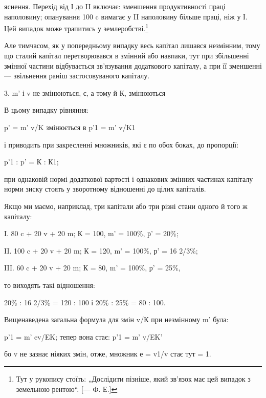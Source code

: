 яснення. Перехід від І до II включає: зменшення продуктивності
праці наполовину; опанування 100 c вимагає у II наполовину
більше праці, ніж у І. Цей випадок може трапитись у землеробстві.\footnote{
Тут у рукопису стоїть: „Дослідити пізніше, який зв’язок має цей випадок
з земельною рентою“. [— Ф. Е.]
}

Але тимчасом, як у попередньому випадку весь капітал
лишався незмінним, тому що сталий капітал перетворювався
в змінний або навпаки, тут при збільшенні змінної частини відбувається
зв’язування додаткового капіталу, а при її зменшенні —
звільнення раніш застосовуваного капіталу.

3. m' і v не змінюються, с, а тому й К, змінюються

В цьому випадку рівняння:

p' = m' v/K змінюється в p'1 = m' v/K1

і приводить при закресленні множників, які є по обох боках,
до пропорції:

p'1 : p' = К : К1;

при однаковій нормі додаткової вартості і однакових змінних
частинах капіталу норми зиску стоять у зворотному відношенні
до цілих капіталів.

Якщо ми маємо, наприклад, три капітали або три різні стани
одного й того ж капіталу:

I. 80 c + 20 v + 20 m; К = 100, m' = 100\%, р' = 20\%;

II. 100 c + 20 v + 20 m; К = 120, m' = 100\%, р' = 16 2/3\%;

III. 60 c + 20 v + 20 m; К = 80, m' = 100\%, р' = 25\%,

то виходять такі відношення:

20\% : 16 2/3\% = 120 : 100 і 20\% : 25\% = 80 : 100.

Вищенаведена загальна формула для змін v/К при незмінному
m' була:

p'1 = m' ev/EK; тепер вона стає: p'1 = m' v/EK'

бо v не зазнає ніяких змін, отже, множник е = v1/v стає тут = 1.